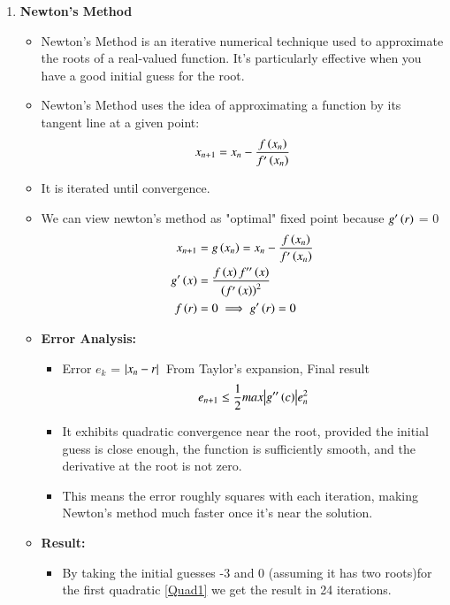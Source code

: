 \documentclass[journal]{IEEEtran}
\numberwithin{equation}{enumi}
\numberwithin{figure}{enumi}
\begin{document}
\begin{enumerate}
\begin{itemize}
    \end{itemize}
    \item \textbf{Newton's Method}
    \begin{itemize}
        \item Newton's Method is an iterative numerical technique used to approximate the roots of a real-valued function. It's particularly effective when you have a good initial guess for the root.
        \item Newton's Method uses the idea of approximating a function by its tangent line at a given point:
        \begin{align}
            x_{n + 1} = x_n - \frac{f\left(x_n\right)}{f^{\prime}\left(x_n\right)}
        \end{align}
        \item It is iterated until convergence.
        \item We can view newton's method as "optimal" fixed point because $g^{\prime}\left(r\right)$ = 0
        \begin{align}
            x_{n + 1} &= g\left(x_n\right) = x_n - \frac{f\left(x_n\right)}{f^{\prime}\left(x_n\right)}\\
            g^{\prime}\left(x\right) &= \frac{f\left(x\right)f^{\prime\prime}\left(x\right)}{\left(f^{\prime}\left(x\right)\right)^2}\\
            f\left(r\right) &= 0 \implies g^{\prime}\left(r\right) = 0
        \end{align}
        \item \textbf{Error Analysis:}\\
        \begin{itemize}
            \item Error $e_k$ = $\left\vert x_n - r\right\vert$\
            From Taylor's expansion, Final result
            \begin{align}
                e_{n + 1} \leq \frac{1}{2} max{\left\vert g^{\prime\prime}\left(c\right)\right\vert}e_n^2
            \end{align}
            \item It exhibits quadratic convergence near the root, provided the initial guess is close enough, the function is sufficiently smooth, and the derivative at the root is not zero. 
            \item This means the error roughly squares with each iteration, making Newton's method much faster once it's near the solution.
        \end{itemize}
    \item \textbf{Result:}
    \begin{itemize}
        \item By taking the initial guesses -3 and 0 (assuming it has two roots)for the first quadratic \eqref{Quad1} we get the result in 24 iterations. 

\end{itemize}
\end{itemize}
\end{enumerate}
\end{document}
